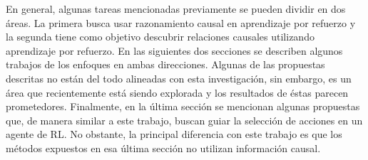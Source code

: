  


En general, algunas tareas mencionadas previamente se pueden dividir en dos áreas. La primera busca usar razonamiento causal en aprendizaje por refuerzo y la segunda tiene como objetivo descubrir relaciones causales utilizando aprendizaje por refuerzo. En las siguientes dos secciones se describen
algunos trabajos de los enfoques en ambas direcciones. Algunas de las
propuestas descritas no están del todo alineadas con esta investigación, sin embargo, es un área que recientemente está siendo explorada y los resultados de éstas parecen prometedores.
Finalmente, en la última sección se mencionan algunas propuestas que, de manera similar a este trabajo, buscan guiar la selección de acciones en un agente de RL. No obstante, la principal diferencia con este trabajo es que los métodos expuestos en esa última sección no utilizan información causal.




